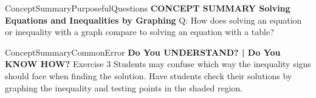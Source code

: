 \documentclass{article}
\newenvironment{te-addendum}[2]{}{}     %
\newcommand{\answer}[1]{}               %
\begin{document}
\begin{te-addendum}{ConceptSummary}{PurposefulQuestions}
\textbf{CONCEPT SUMMARY Solving Equations and Inequalities by Graphing}
Q: How does solving an equation or inequality with a graph compare to solving an equation with a table?
\answer{The graph provides a quick approximate solution and also can narrow down your focus for your table. Sometimes if the graph you created by hand does not correspond to a grid point, creating a table may provide a more accurate approximate solution. However, using the INTERSECT feature with graphing technology also allows you to create an accurate approximate solution from your graph.}
\end{te-addendum}
\begin{te-addendum}{ConceptSummary}{CommonError}
\textbf{Do You UNDERSTAND? | Do You KNOW HOW?}
Exercise 3 Students may confuse which way the inequality signs should face when finding the solution. Have students check their solutions by graphing the inequality and testing points in the shaded region.
\end{te-addendum}
\end{document}
